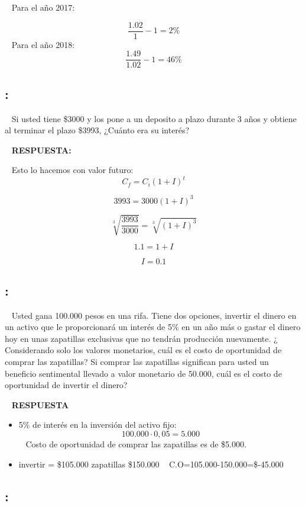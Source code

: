 \documentclass[
  letterpaper,
  DIV=11,
  numbers=noendperiod]{scrreport}
\providecommand{\tightlist}{%
  \setlength{\itemsep}{0pt}\setlength{\parskip}{0pt}}\usepackage{longtable,booktabs,array}
\begin{document}
~ Para el año 2017:

\[
\frac{1.02}{1}-1=2\%
\] ~ Para el año 2018: \[
\frac{1.49}{1.02}-1=46\%
\]

\hypertarget{section-36}{%
\subsection{:}\label{section-36}}

~ Si usted tiene \$3000 y los pone a un deposito a plazo durante 3 años
y obtiene al terminar el plazo \$3993, ¿Cuánto era su interés?

~ \textbf{RESPUESTA:}

~ Esto lo hacemos con valor futuro: \[
C_f=C_i(1+I)^t
\]

\[
3993=3000(1+I)^3
\]

\[
\sqrt[3]{\frac{3993}{3000}}=\sqrt[3]{(1+I)^3}
\]

\[
1.1=1+I
\]

\[
I=0.1
\]

\hypertarget{section-37}{%
\subsection{:}\label{section-37}}

~ Usted gana 100.000 pesos en una rifa. Tiene dos opciones, invertir el
dinero en un activo que le proporcionará un interés de 5\% en un año más
o gastar el dinero hoy en unas zapatillas exclusivas que no tendrán
producción nuevamente. ¿ Considerando solo los valores monetarios, cuál
es el costo de oportunidad de comprar las zapatillas? Si comprar las
zapatillas significan para usted un beneficio sentimental llevado a
valor monetario de 50.000, cuál es el costo de oportunidad de invertir
el dinero?

~ \textbf{RESPUESTA}

\begin{itemize}
\tightlist
\item
  5\% de interés en la inversión del activo fijo:
  \[100.000\cdot0,05=5.000\] ~ Costo de oportunidad de comprar las
  zapatillas es de \$5.000.
\item
  invertir = \$105.000 zapatillas \$150.000 ~
  C.O=105.000-150.000=\$-45.000
\end{itemize}

\hypertarget{section-38}{%
\subsection{:}\label{section-38}}
\end{document}

